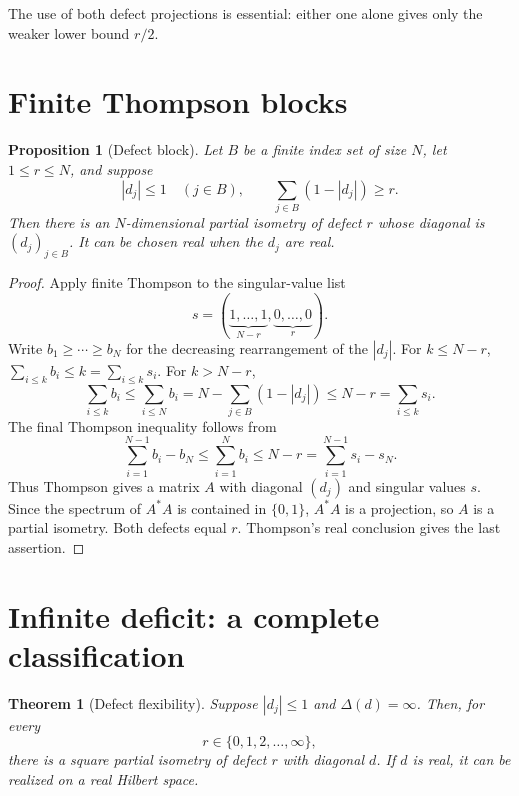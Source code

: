 \documentclass[11pt]{article}
\newtheorem{theorem}{Theorem}
\newtheorem{proposition}{Proposition}
\begin{document}
The use of both defect projections is essential: either one alone gives only
the weaker lower bound $r/2$.

\section{Finite Thompson blocks}

\begin{proposition}[Defect block]\label{prop:block}
Let $B$ be a finite index set of size $N$, let $1\le r\le N$, and
suppose
\[
 |d_j|\le1\quad(j\in B),
 \qquad \sum_{j\in B}(1-|d_j|)\ge r.                         \tag{4}\label{eq:block}
\]
Then there is an $N$-dimensional partial isometry of defect $r$ whose
diagonal is $(d_j)_{j\in B}$.  It can be chosen real when the $d_j$ are
real.
\end{proposition}

\begin{proof}
Apply finite Thompson to the singular-value list
\[
 s=(\underbrace{1,\ldots,1}_{N-r},
       \underbrace{0,\ldots,0}_{r}).
\]
Write $b_1\ge\cdots\ge b_N$ for the decreasing rearrangement of the
$|d_j|$.  For $k\le N-r$, $\sum_{i\le k}b_i\le k=\sum_{i\le k}s_i$.
For $k>N-r$,
\[
 \sum_{i\le k}b_i\le\sum_{i\le N}b_i
 =N-\sum_{j\in B}(1-|d_j|)\le N-r=\sum_{i\le k}s_i.
\]
The final Thompson inequality follows from
\[
 \sum_{i=1}^{N-1}b_i-b_N\le\sum_{i=1}^N b_i\le N-r
=\sum_{i=1}^{N-1}s_i-s_N.
\]
Thus Thompson gives a matrix
$A$ with diagonal $(d_j)$ and singular values $s$.  Since the spectrum
of $A^*A$ is contained in $\{0,1\}$, $A^*A$ is a projection, so $A$
is a partial isometry.  Both defects equal $r$.  Thompson's real conclusion
gives the last assertion.
\end{proof}

\section{Infinite deficit: a complete classification}

\begin{theorem}[Defect flexibility]\label{thm:flex}
Suppose $|d_j|\le1$ and $\Delta(d)=\infty$.  Then, for every
\[
 r\in\{0,1,2,\ldots,\infty\},
\]
there is a square partial isometry of defect $r$ with diagonal $d$.
If $d$ is real, it can be realized on a real Hilbert space.
\end{theorem}
\end{document}
